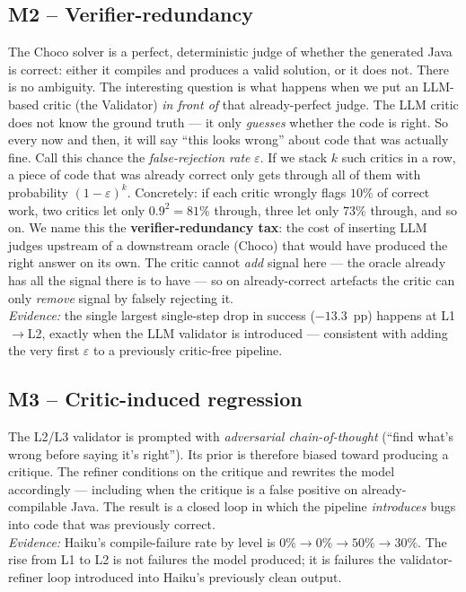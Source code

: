 \documentclass[11pt,a4paper]{article}
\begin{document}
\subsection{M2 -- Verifier-redundancy}
The Choco solver is a perfect, deterministic judge of whether the
generated Java is correct: either it compiles and produces a valid
solution, or it does not. There is no ambiguity. The interesting question
is what happens when we put an LLM-based critic (the Validator) \emph{in
front of} that already-perfect judge. The LLM critic does not know the
ground truth --- it only \emph{guesses} whether the code is right. So
every now and then, it will say ``this looks wrong'' about code that was
actually fine. Call this chance the \emph{false-rejection rate}
$\varepsilon$. If we stack $k$ such critics in a row, a piece of code
that was already correct only gets through all of them with probability
$(1-\varepsilon)^k$. Concretely: if each critic wrongly flags $10\%$ of
correct work, two critics let only $0.9^2 = 81\%$ through, three let only
$73\%$ through, and so on. We name this the
\textbf{verifier-redundancy tax}: the cost of inserting LLM judges
upstream of a downstream oracle (Choco) that would have produced the
right answer on its own. The critic cannot \emph{add} signal here ---
the oracle already has all the signal there is to have --- so on
already-correct artefacts the critic can only \emph{remove} signal by
falsely rejecting it.\\
\textit{Evidence:} the single largest single-step drop in success
($-13.3$~pp) happens at L1$\to$L2, exactly when the LLM validator is
introduced --- consistent with adding the very first $\varepsilon$ to a
previously critic-free pipeline.

\subsection{M3 -- Critic-induced regression}
The L2/L3 validator is prompted with \emph{adversarial chain-of-thought}
(``find what's wrong before saying it's right''). Its prior is therefore
biased toward producing a critique. The refiner conditions on the critique
and rewrites the model accordingly --- including when the critique is a
false positive on already-compilable Java. The result is a closed loop in
which the pipeline \emph{introduces} bugs into code that was previously
correct.\\
\textit{Evidence:} Haiku's compile-failure rate by level is
$0\% \to 0\% \to 50\% \to 30\%$. The rise from L1 to L2 is not failures the
model produced; it is failures the validator-refiner loop introduced into
Haiku's previously clean output.
\end{document}

